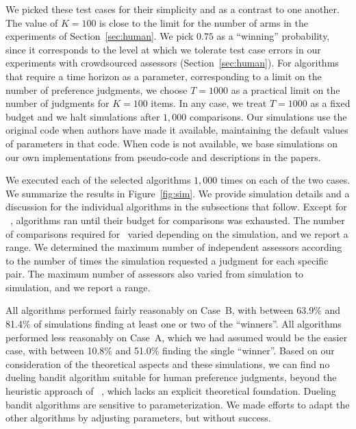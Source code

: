 We picked these test cases for their simplicity and as a contrast to one another. The value of $K = 100$ is close to the limit for the number of arms in the experiments of  Section~\ref{sec:human}. We pick $0.75$ as a ``winning'' probability, since it corresponds to the level at which we tolerate test case errors in our experiments with crowdsourced assessors (Section~\ref{sec:human}). For algorithms that require a time horizon as a parameter, corresponding to a limit on the number of preference judgments, we choose $T = 1000$ as a practical limit on the number of judgments for $K = 100$ items. In any case, we treat $T = 1000$ as a fixed budget and we halt simulations after $1,000$ comparisons. Our simulations use the original code when authors have made it available, maintaining the default values of parameters in that code. When code is not available, we base simulations on our own implementations from pseudo-code and descriptions in the papers. 

We executed each of the selected algorithms $1,000$ times on each of the two cases. We summarize the results in Figure~\ref{fig:sim}. We provide simulation details and a discussion for the individual algorithms in the subsections that follow. Except for ~\citet{cvs21}, algorithms ran until their budget for comparisons was exhausted. The number of comparisons required for~\citet{cvs21} varied depending on the simulation, and we report a range. We determined the maximum number of independent assessors according to the number of times the simulation requested a judgment for each specific pair. The maximum number of assessors also varied from simulation to simulation, and we report a range.

All algorithms performed fairly reasonably on Case~B, with between 63.9\% and 81.4\% of simulations finding at least one or two of the ``winners''.  All algorithms performed less reasonably on Case~A, which we had assumed would be the easier case, with between 10.8\% and 51.0\% finding the single ``winner''. Based on our consideration of the theoretical aspects and these simulations, we can find no dueling bandit algorithm suitable for human preference judgments, beyond the heuristic approach of ~\citet{cvs21}, which lacks an explicit theoretical foundation. Dueling bandit algorithms are sensitive to parameterization. We made efforts to adapt the other algorithms by adjusting parameters, but without success.

